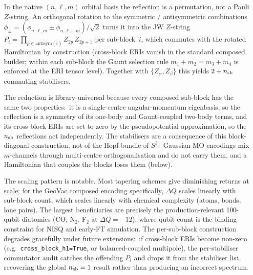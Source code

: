 \documentclass[aps,pra,twocolumn,superscriptaddress,longbibliography]{revtex4-2}
\begin{document}
In the native $(n, \ell, m)$ orbital basis the reflection is a
permutation, not a Pauli $Z$-string.  An orthogonal rotation to
the symmetric / antisymmetric combinations
$\phi_\pm = (\phi_{n,\ell,m} \pm \phi_{n,\ell,-m})/\sqrt{2}$ turns
it into the JW $Z$-string
$P_i = \prod_{p \in \text{antisym}(i)} Z_{2p}\,Z_{2p+1}$ per
sub-block~$i$, which commutes with the rotated Hamiltonian by
construction (cross-block ERIs vanish in the standard composed
builder; within each sub-block the Gaunt selection rule
$m_1 + m_2 = m_3 + m_4$ is enforced at the ERI tensor level).
Together with $\{Z_\alpha, Z_\beta\}$ this yields $2 + n_{\rm sb}$
commuting stabilisers.

The reduction is library-universal because every composed sub-block has
the same two properties:\ it is a single-centre angular-momentum
eigenbasis, so the reflection is a symmetry of its one-body and
Gaunt-coupled two-body terms, and its cross-block ERIs are set to zero
by the pseudopotential approximation, so the $n_{\rm sb}$ reflections act
independently.  The stabilisers are a consequence of this block-diagonal
construction, not of the Hopf bundle of $S^3$:\ Gaussian MO encodings
mix $m$-channels through multi-centre orthogonalisation and do not carry
them, and a Hamiltonian that couples the blocks loses them (below).

The scaling pattern is notable.  Most tapering schemes give
diminishing returns at scale; for the GeoVac composed encoding
specifically, $\Delta Q$ scales linearly with sub-block count,
which scales linearly with chemical complexity (atoms, bonds,
lone pairs).  The largest beneficiaries are precisely the
production-relevant 100-qubit diatomics (CO, N$_2$, F$_2$ at
$\Delta Q = -12$), where qubit count is the binding constraint
for NISQ and early-FT simulation.  The per-sub-block construction
degrades gracefully under future extensions:\ if cross-block ERIs
become non-zero (e.g.\ \texttt{cross\_block\_h1=True}, or
balanced-coupled multipole), the per-stabiliser commutator audit
catches the offending $P_i$ and drops it from the stabiliser list,
recovering the global $n_{\rm sb}=1$ result rather than producing
an incorrect spectrum.  
\end{document}
